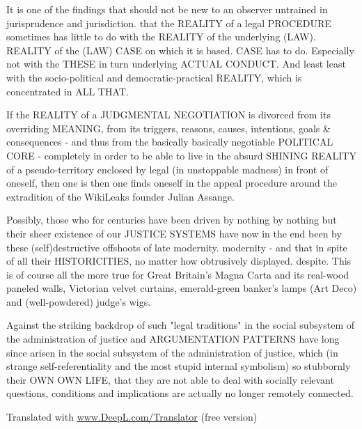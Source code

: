 \begin{multicols}{2}
It is one of the findings that should not be new to an observer untrained in jurisprudence and jurisdiction.
that the REALITY of a legal PROCEDURE sometimes has little to do with the REALITY of the underlying (LAW).
REALITY of the (LAW) CASE on which it is based.
CASE has to do. Especially not with the THESE
in turn underlying ACTUAL CONDUCT. And least
least with the socio-political and democratic-practical REALITY, which is concentrated in ALL THAT.

If the REALITY of a JUDGMENTAL NEGOTIATION is divorced from its overriding MEANING, from its triggers, reasons, causes, intentions, goals \& consequences - and thus from the basically
basically negotiable POLITICAL CORE - completely
in order to be able to live in the absurd SHINING REALITY of a pseudo-territory enclosed by legal
(in unstoppable madness) in front of oneself, then one is
then one finds oneself in the appeal procedure around the extradition of the WikiLeaks founder
Julian Assange.

Possibly, those who for centuries have been driven by nothing
by nothing but their sheer existence of our JUSTICE SYSTEMS have now in the end been
by these (self)destructive offshoots of late modernity.
modernity - and that in spite of all their HISTORICITIES, no matter how obtrusively displayed.
despite. This is of course all the more true for Great Britain's
Magna Carta and its real-wood paneled walls, Victorian velvet curtains, emerald-green banker's lamps (Art Deco) and (well-powdered) judge's wigs.

Against the striking backdrop of such "legal traditions"
in the social subsystem of the administration of justice
and ARGUMENTATION PATTERNS have long since arisen in the social subsystem of the administration of justice, which (in strange self-referentiality and the most stupid internal symbolism) so stubbornly
their OWN OWN LIFE, that they are not able to deal with
socially relevant questions, conditions and implications are actually no longer remotely connected.

Translated with \url{www.DeepL.com/Translator} (free version)



\end{multicols}
